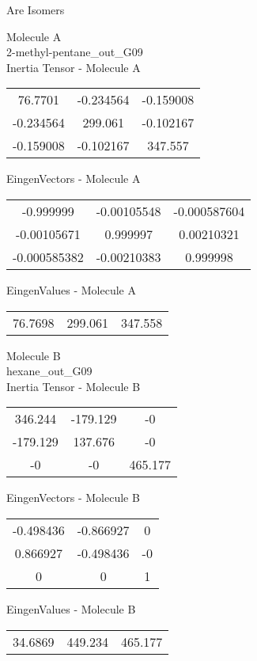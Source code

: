 \begin{center}
\vtab
\vtab
\textcolor{NavyBlue}{\Large Are Isomers}
\end{center}
\newpage
\begin{multicols}{2}
\begin{center}
Molecule A \\ 
2-methyl-pentane\_out\_G09
\\
Inertia Tensor - Molecule A \\
\vtab
\begin{tabular}{|c c c|}
76.7701	 & 	-0.234564	 & 	-0.159008	 \\
-0.234564	 & 	299.061	 & 	-0.102167	 \\
-0.159008	 & 	-0.102167	 & 	347.557
\end{tabular}

\vtab
 EingenVectors - Molecule A     \\
\vtab
\begin{tabular}{|c c c|}
-0.999999	 & 	-0.00105548	 & 	-0.000587604	 \\
-0.00105671	 & 	0.999997	 & 	0.00210321	 \\
-0.000585382	 & 	-0.00210383	 & 	0.999998
\end{tabular}

\vtab
 EingenValues - Molecule A     \\
\vtab
\begin{tabular}{|c c c|}
76.7698	 & 	299.061	 & 	347.558
\end{tabular}
\columnbreak

Molecule B \\ 
hexane\_out\_G09
\\
Inertia Tensor - Molecule B \\
\vtab
\begin{tabular}{|c c c|}
346.244	 & 	-179.129	 & 	-0	 \\
-179.129	 & 	137.676	 & 	-0	 \\
-0	 & 	-0	 & 	465.177
\end{tabular}

\vtab
 EingenVectors - Molecule B     \\
\vtab
\begin{tabular}{|c c c|}
-0.498436	 & 	-0.866927	 & 	0	 \\
0.866927	 & 	-0.498436	 & 	-0	 \\
0	 & 	0	 & 	1
\end{tabular}

\vtab
 EingenValues - Molecule B     \\
\vtab
\begin{tabular}{|c c c|}
34.6869	 & 	449.234	 & 	465.177
\end{tabular}

\end{center}
\end{multicols}
